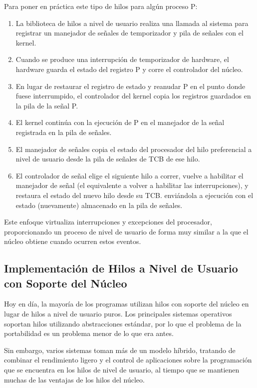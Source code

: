 \documentclass[10pt]{book}
\begin{document}
Para poner en práctica este tipo de hilos para algún proceso P:
\begin{enumerate}
\item La biblioteca de hilos a nivel de usuario realiza una llamada al sistema para registrar un manejador de señales de temporizador y pila de señales con el kernel.
\item Cuando se produce una interrupción de temporizador de hardware, el hardware guarda el estado del registro P y corre el controlador del núcleo.
\item En lugar de restaurar el registro de estado y reanudar P en el punto donde fuese interrumpido, el controlador del kernel copia los registros guardados en la pila de la señal P.
\item El kernel continúa con la ejecución de P en el manejador de la señal registrada en la pila de señales.
\item El manejador de señales copia el estado del procesador del hilo preferencial a nivel de usuario desde la pila de señales de TCB de ese hilo.
\item El controlador de señal elige el siguiente hilo a correr, vuelve a habilitar el manejador de señal (el equivalente a volver a habilitar las interrupciones), y restaura el estado del nuevo hilo desde su TCB. enviándola a ejecución con el estado (nuevamente) almacenado en la pila de señales.
\end{enumerate}

Este enfoque virtualiza interrupciones y excepciones del procesador, proporcionando un proceso de nivel de usuario de forma muy similar a la que el núcleo obtiene cuando ocurren estos eventos.

\subsection{Implementación de Hilos a Nivel de Usuario con Soporte del Núcleo}
Hoy en día, la mayoría de los programas utilizan hilos con soporte del núcleo en lugar de hilos a nivel de usuario puros. Los principales sistemas operativos soportan hilos utilizando abstracciones estándar, por lo que el problema de la portabilidad es un problema menor de lo que era antes.

Sin embargo, varios sistemas toman más de un modelo híbrido, tratando de combinar el rendimiento ligero y el control de aplicaciones sobre la programación que se encuentra en los hilos de nivel de usuario, al tiempo que se mantienen muchas de las ventajas de los hilos del núcleo.
\end{document}
